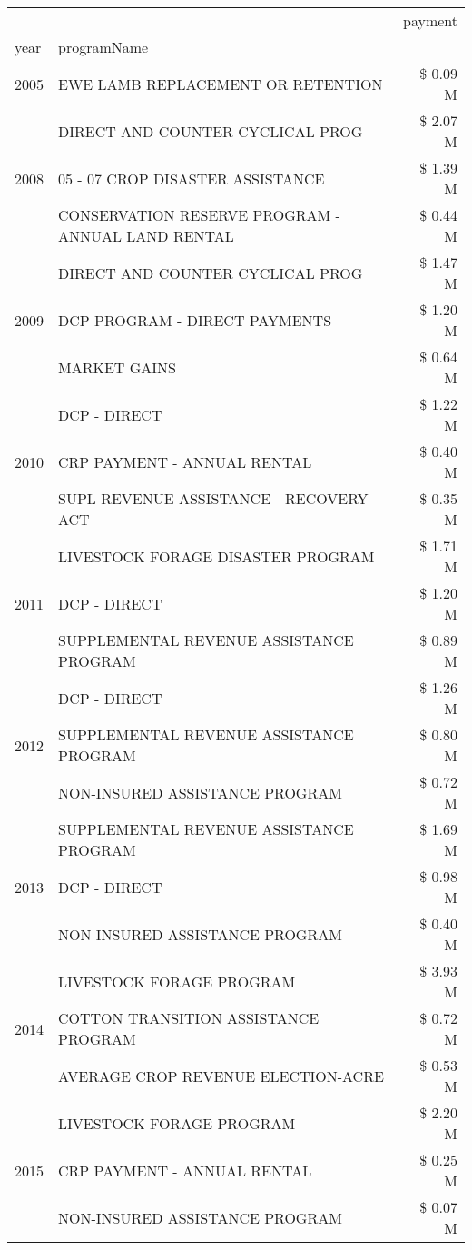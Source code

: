 \begin{tabular}{llr}
\toprule
 &  & payment \\
year & programName &  \\
\midrule
2005 & EWE LAMB REPLACEMENT OR RETENTION & \$ 0.09 M \\
\cline{1-3}
\multirow[t]{3}{*}{2008} & DIRECT AND COUNTER CYCLICAL PROG & \$ 2.07 M \\
 & 05 - 07 CROP DISASTER ASSISTANCE & \$ 1.39 M \\
 & CONSERVATION RESERVE PROGRAM - ANNUAL LAND RENTAL & \$ 0.44 M \\
\cline{1-3}
\multirow[t]{3}{*}{2009} & DIRECT AND COUNTER CYCLICAL PROG & \$ 1.47 M \\
 & DCP PROGRAM - DIRECT PAYMENTS & \$ 1.20 M \\
 & MARKET GAINS & \$ 0.64 M \\
\cline{1-3}
\multirow[t]{3}{*}{2010} & DCP - DIRECT & \$ 1.22 M \\
 & CRP PAYMENT - ANNUAL RENTAL & \$ 0.40 M \\
 & SUPL REVENUE ASSISTANCE - RECOVERY ACT & \$ 0.35 M \\
\cline{1-3}
\multirow[t]{3}{*}{2011} & LIVESTOCK FORAGE DISASTER PROGRAM & \$ 1.71 M \\
 & DCP - DIRECT & \$ 1.20 M \\
 & SUPPLEMENTAL REVENUE ASSISTANCE PROGRAM & \$ 0.89 M \\
\cline{1-3}
\multirow[t]{3}{*}{2012} & DCP - DIRECT & \$ 1.26 M \\
 & SUPPLEMENTAL REVENUE ASSISTANCE PROGRAM & \$ 0.80 M \\
 & NON-INSURED ASSISTANCE PROGRAM & \$ 0.72 M \\
\cline{1-3}
\multirow[t]{3}{*}{2013} & SUPPLEMENTAL REVENUE ASSISTANCE PROGRAM & \$ 1.69 M \\
 & DCP - DIRECT & \$ 0.98 M \\
 & NON-INSURED ASSISTANCE PROGRAM & \$ 0.40 M \\
\cline{1-3}
\multirow[t]{3}{*}{2014} & LIVESTOCK FORAGE PROGRAM & \$ 3.93 M \\
 & COTTON TRANSITION ASSISTANCE PROGRAM & \$ 0.72 M \\
 & AVERAGE CROP REVENUE ELECTION-ACRE & \$ 0.53 M \\
\cline{1-3}
\multirow[t]{3}{*}{2015} & LIVESTOCK FORAGE PROGRAM & \$ 2.20 M \\
 & CRP PAYMENT - ANNUAL RENTAL & \$ 0.25 M \\
 & NON-INSURED ASSISTANCE PROGRAM & \$ 0.07 M \\

\end{tabular}
